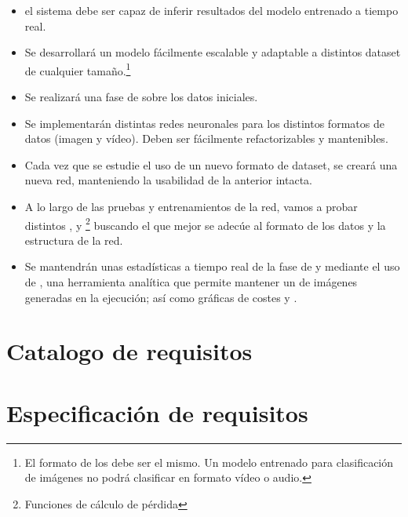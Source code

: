 \begin{itemize}
  \item el sistema debe ser capaz de inferir resultados del modelo entrenado a tiempo real.
  \item Se desarrollará un modelo fácilmente escalable y adaptable a distintos dataset de cualquier tamaño.\footnote{El formato de los  debe ser el mismo. Un modelo entrenado para clasificación de imágenes no podrá clasificar en formato vídeo o audio.}
  \item Se realizará una fase de  sobre los datos iniciales.
  \item Se implementarán distintas redes neuronales para los distintos formatos de datos (imagen y vídeo). Deben ser fácilmente refactorizables y mantenibles.
  \item Cada vez que se estudie el uso de un nuevo formato de dataset, se creará una nueva red, manteniendo la usabilidad de la anterior intacta.
  \item A lo largo de las pruebas y entrenamientos de la red, vamos a probar distintos ,  y \footnote{Funciones de cálculo de pérdida} buscando el que mejor se adecúe al formato de los datos y la estructura de la red.
  \item Se mantendrán unas estadísticas a tiempo real de la fase de  y  mediante el uso de , una herramienta analítica que permite mantener un  de imágenes generadas en la ejecución; así como gráficas de costes y .
\end{itemize}


\section{Catalogo de requisitos}

\section{Especificación de requisitos}



